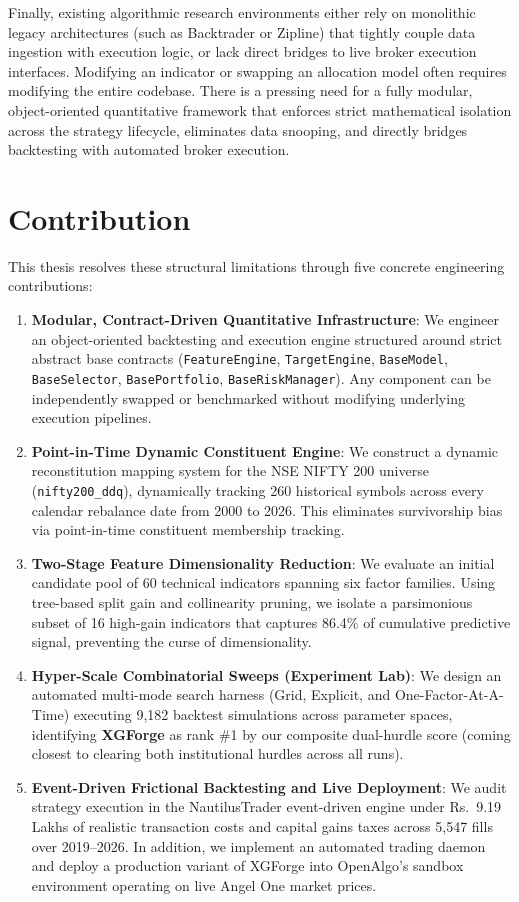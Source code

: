 Finally, existing algorithmic research environments either rely on monolithic legacy architectures (such as Backtrader or Zipline) that tightly couple data ingestion with execution logic, or lack direct bridges to live broker execution interfaces. Modifying an indicator or swapping an allocation model often requires modifying the entire codebase. There is a pressing need for a fully modular, object-oriented quantitative framework that enforces strict mathematical isolation across the strategy lifecycle, eliminates data snooping, and directly bridges backtesting with automated broker execution.


\section{Contribution}
\label{sec:contribution}
This thesis resolves these structural limitations through five concrete engineering contributions:
\begin{enumerate}
    \item \textbf{Modular, Contract-Driven Quantitative Infrastructure}: We engineer an object-oriented backtesting and execution engine structured around strict abstract base contracts (\texttt{FeatureEngine}, \texttt{TargetEngine}, \texttt{BaseModel}, \texttt{BaseSelector}, \texttt{BasePortfolio}, \texttt{BaseRiskManager}). Any component can be independently swapped or benchmarked without modifying underlying execution pipelines.
    \item \textbf{Point-in-Time Dynamic Constituent Engine}: We construct a dynamic reconstitution mapping system for the NSE NIFTY 200 universe (\texttt{nifty200\_ddq}), dynamically tracking 260 historical symbols across every calendar rebalance date from 2000 to 2026. This eliminates survivorship bias via point-in-time constituent membership tracking.
    \item \textbf{Two-Stage Feature Dimensionality Reduction}: We evaluate an initial candidate pool of 60 technical indicators spanning six factor families. Using tree-based split gain and collinearity pruning, we isolate a parsimonious subset of 16 high-gain indicators that captures 86.4\% of cumulative predictive signal, preventing the curse of dimensionality.
    \item \textbf{Hyper-Scale Combinatorial Sweeps (Experiment Lab)}: We design an automated multi-mode search harness (Grid, Explicit, and One-Factor-At-A-Time) executing 9,182 backtest simulations across parameter spaces, identifying \textbf{XGForge} as rank \#1 by our composite dual-hurdle score (coming closest to clearing both institutional hurdles across all runs).
    \item \textbf{Event-Driven Frictional Backtesting and Live Deployment}: We audit strategy execution in the NautilusTrader event-driven engine under \textsf{Rs.~}9.19 Lakhs of realistic transaction costs and capital gains taxes across 5,547 fills over 2019--2026. In addition, we implement an automated trading daemon and deploy a production variant of XGForge into OpenAlgo's sandbox environment operating on live Angel One market prices.
\end{enumerate}

